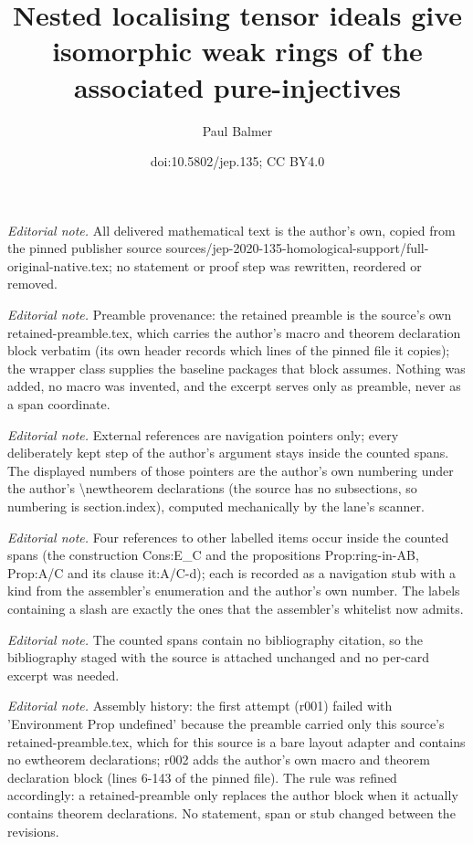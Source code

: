 \documentclass[10pt,a4paper]{amsart}
\title{Nested localising tensor ideals give isomorphic weak rings of the associated pure-injectives}
\author{Paul Balmer}
\date{doi:10.5802/jep.135; CC BY4.0}
\numberwithin{equation}{section}
\theoremstyle{definition}
\begin{document}
\maketitle
\noindent\textit{Editorial note.} All delivered mathematical text is the author's own, copied from the pinned publisher source sources/jep-2020-135-homological-support/full-original-native.tex; no statement or proof step was rewritten, reordered or removed.\par\medskip
\noindent\textit{Editorial note.} Preamble provenance: the retained preamble is the source's own retained-preamble.tex, which carries the author's macro and theorem declaration block verbatim (its own header records which lines of the pinned file it copies); the wrapper class supplies the baseline packages that block assumes. Nothing was added, no macro was invented, and the excerpt serves only as preamble, never as a span coordinate.\par\medskip
\noindent\textit{Editorial note.} External references are navigation pointers only; every deliberately kept step of the author's argument stays inside the counted spans. The displayed numbers of those pointers are the author's own numbering under the author's \textbackslash{}newtheorem declarations (the source has no subsections, so numbering is section.index), computed mechanically by the lane's scanner.\par\medskip
\noindent\textit{Editorial note.} Four references to other labelled items occur inside the counted spans (the construction Cons:E\_C and the propositions Prop:ring-in-AB, Prop:A/C and its clause it:A/C-d); each is recorded as a navigation stub with a kind from the assembler's enumeration and the author's own number. The labels containing a slash are exactly the ones that the assembler's whitelist now admits.\par\medskip
\noindent\textit{Editorial note.} The counted spans contain no bibliography citation, so the bibliography staged with the source is attached unchanged and no per-card excerpt was needed.\par\medskip
\noindent\textit{Editorial note.} Assembly history: the first attempt (r001) failed with 'Environment Prop undefined' because the preamble carried only this source's retained-preamble.tex, which for this source is a bare layout adapter and contains no  ewtheorem declarations; r002 adds the author's own macro and theorem declaration block (lines 6-143 of the pinned file). The rule was refined accordingly: a retained-preamble only replaces the author block when it actually contains theorem declarations. No statement, span or stub changed between the revisions.\par\medskip
\end{document}
